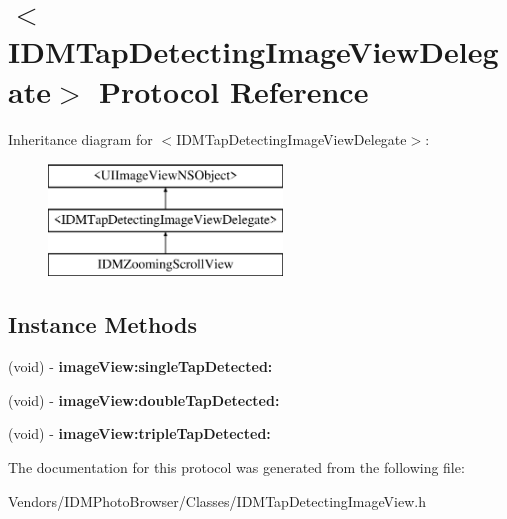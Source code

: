 \hypertarget{protocol_i_d_m_tap_detecting_image_view_delegate-p}{}\section{$<$I\+D\+M\+Tap\+Detecting\+Image\+View\+Delegate$>$ Protocol Reference}
\label{protocol_i_d_m_tap_detecting_image_view_delegate-p}
Inheritance diagram for $<$I\+D\+M\+Tap\+Detecting\+Image\+View\+Delegate$>$\+:\begin{figure}[H]
\begin{center}
\leavevmode
\includegraphics[height=3.000000cm]{protocol_i_d_m_tap_detecting_image_view_delegate-p}
\end{center}
\end{figure}
\subsection*{Instance Methods}
\begin{DoxyCompactItemize}
\item 
\hypertarget{protocol_i_d_m_tap_detecting_image_view_delegate-p_afafd5a1ef88e462bdae105b8d5b543c5}{}(void) -\/ {\bfseries image\+View\+:single\+Tap\+Detected\+:}\label{protocol_i_d_m_tap_detecting_image_view_delegate-p_afafd5a1ef88e462bdae105b8d5b543c5}

\item 
\hypertarget{protocol_i_d_m_tap_detecting_image_view_delegate-p_aec757f971a1f6b08fe29a830097f4b28}{}(void) -\/ {\bfseries image\+View\+:double\+Tap\+Detected\+:}\label{protocol_i_d_m_tap_detecting_image_view_delegate-p_aec757f971a1f6b08fe29a830097f4b28}

\item 
\hypertarget{protocol_i_d_m_tap_detecting_image_view_delegate-p_abfc42f16f998935e703d8f118bfde878}{}(void) -\/ {\bfseries image\+View\+:triple\+Tap\+Detected\+:}\label{protocol_i_d_m_tap_detecting_image_view_delegate-p_abfc42f16f998935e703d8f118bfde878}

\end{DoxyCompactItemize}


The documentation for this protocol was generated from the following file\+:\begin{DoxyCompactItemize}
\item 
Vendors/\+I\+D\+M\+Photo\+Browser/\+Classes/I\+D\+M\+Tap\+Detecting\+Image\+View.\+h\end{DoxyCompactItemize}
